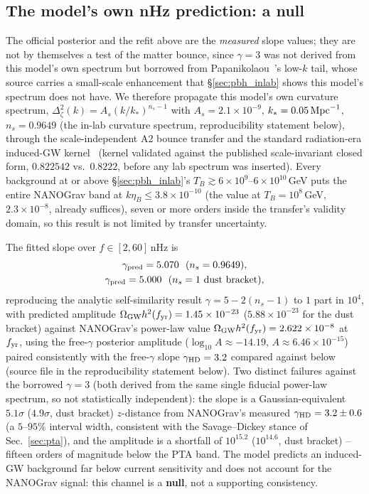 \documentclass[aps,prd,twocolumn,superscriptaddress,nofootinbib,longbibliography]{revtex4-2}
\newcommand{\OmGW}{\Omega_{\rm GW}}
\begin{document}
\subsection{The model's own nHz prediction: a null}
\label{sec:pta_null}

The official posterior and the refit above are the \emph{measured} slope
values; they are not by themselves a test of the matter bounce, since
$\gamma=3$ was not derived from this model's own spectrum but borrowed from
Papanikolaou~\cite{Papanikolaou2025}'s low-$k$ tail, whose source carries a
small-scale enhancement that \S\ref{sec:pbh_inlab} shows this model's
spectrum does not have. We therefore propagate this model's own
curvature spectrum, $\Delta^2_\zeta(k)=A_s(k/k_*)^{n_s-1}$ with
$A_s=2.1\times10^{-9}$, $k_*=0.05\,{\rm Mpc}^{-1}$, $n_s=0.9649$
(the in-lab curvature spectrum, reproducibility statement below), through the
scale-independent A2 bounce transfer and the standard radiation-era
induced-GW kernel~\cite{KohriTerada2018} (kernel validated against the
published scale-invariant closed form, $0.822542$ vs.\ $0.8222$, before any
lab spectrum was inserted). Every background at or above
\S\ref{sec:pbh_inlab}'s $T_B\gtrsim6\times10^{9}$--$6\times10^{10}\,$GeV puts the entire NANOGrav
band at $k\eta_B\le3.8\times10^{-10}$ (the value at $T_B=10^{8}\,$GeV,
$2.3\times10^{-8}$, already suffices), seven or more orders inside the
transfer's validity domain, so this result is not limited by transfer
uncertainty.

The fitted slope over $f\in[2,60]\,$nHz is
\begin{equation}
\begin{gathered}
  \gamma_{\rm pred} = 5.070 \ \ (n_s=0.9649), \\
  \gamma_{\rm pred} = 5.000 \ \ (n_s=1\ \text{dust bracket}),
\end{gathered}
  \label{eq:gammapred}
\end{equation}
reproducing the analytic self-similarity result $\gamma=5-2(n_s-1)$ to
$1$ part in $10^4$, with predicted amplitude
$\OmGW h^2(f_{\rm yr})=1.45\times10^{-23}$
($5.88\times10^{-23}$ for the dust bracket) against NANOGrav's power-law
value $\OmGW h^2(f_{\rm yr})=2.622\times10^{-8}$ at $f_{\rm yr}$, using the
free-$\gamma$ posterior amplitude ($\log_{10}A\approx-14.19$,
$A\approx6.46\times10^{-15}$) paired consistently with the free-$\gamma$
slope $\gamma_{\rm HD}=3.2$ compared against below (source file in the
reproducibility statement below). Two
distinct failures against the borrowed $\gamma=3$ (both derived from the
same single fiducial power-law spectrum, so not statistically
independent): the slope is a
Gaussian-equivalent $5.1\sigma$ ($4.9\sigma$, dust bracket) $z$-distance from
NANOGrav's measured $\gamma_{\rm HD}=3.2\pm0.6$ (a $5$--$95\%$ interval
width, consistent with the Savage--Dickey stance of
Sec.~\ref{sec:pta}), and the amplitude is a shortfall of
$10^{15.2}$ ($10^{14.6}$, dust bracket) -- fifteen orders of magnitude
below the PTA band. The model predicts an induced-GW background far below
current sensitivity and does not account for the NANOGrav signal: this
channel is a \textbf{null}, not a supporting consistency.
\end{document}
